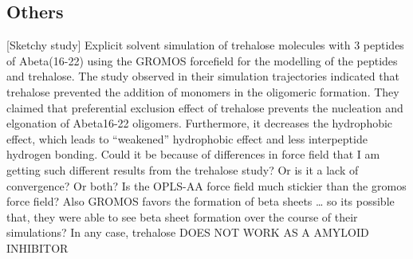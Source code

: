 \subsection{Others}
[Sketchy study] Explicit solvent simulation of trehalose molecules with 3 peptides of Abeta(16-22) using the GROMOS forcefield for the modelling of the peptides and trehalose.  The study observed in their simulation trajectories indicated that trehalose prevented the addition of monomers in the oligomeric formation. They claimed that preferential exclusion effect of trehalose prevents the nucleation and elgonation of Abeta16-22 oligomers. Furthermore, it decreases the hydrophobic effect, which leads to “weakened” hydrophobic effect and less interpeptide hydrogen bonding.  Could it be because of differences in force field that I am getting such different results from the trehalose study?  Or is it a lack of convergence?  Or both?  Is the OPLS-AA force field much stickier than the gromos force field?  Also GROMOS favors the formation of beta sheets … so its possible that, they were able to see beta sheet formation over the course of their simulations? In any case, trehalose DOES NOT WORK AS A AMYLOID INHIBITOR




